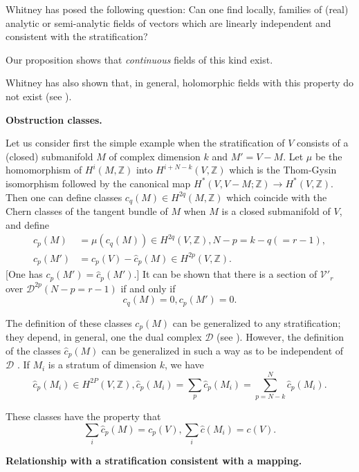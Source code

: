 Whitney has posed the following question: Can one find locally,
families of (real) analytic or semi-analytic fields of vectors which
are linearly independent and consistent with the stratification?

Our proposition shows that {\em continuous} fields of this kind exist.

Whitney has also shown that, in general, holomorphic fields with this
property do not exist (see \cite{key6}).

\medskip
{\large\bf Obstruction classes.}\pageoriginale
\smallskip

Let us consider first the simple example when the stratification of
$V$ consists of a (closed) submanifold $M$ of complex dimension $k$
and $M'=V-M$. Let $\mu$ be the homomorphism of $H^{i}(M,\mathbb{Z})$
into $H^{i+N-k}(V,\mathbb{Z})$ which is the Thom-Gysin isomorphism
followed by the canonical map $H^{*}(V,V-M;\mathbb{Z})\to
H^{*}(V,\mathbb{Z})$. Then one can define classes $c_{q}(M)\in
H^{2q}(M,\mathbb{Z})$ which coincide with the Chern classes of the
tangent bundle of $M$ when $M$ is a closed submanifold of $V$, and define
\begin{align*}
 \hat{c}_p(M)&=\mu(c_q(M)) \in H^{2q}(V,\mathbb{Z}),N-p=k-q(=r-1),\\
  \hat{c}_p(M')&=c_p(V)-\hat{c}_p(M)\in H^{2p}(V,\mathbb{Z}).
\end{align*}
[One has $c_{p}(M')=\hat{c}_{p}(M')$.] It can be shown that there is a
section of $\mathscr{V}'_{r}$ over $\mathscr{D}^{2p}(N-p=r-1)$ if and
only if
$$
c_q(M)=0,c_p(M')=0.
$$

The definition of these classes $c_{p}(M)$ can be generalized to any
stratification; they depend, in general, one the dual complex
$\mathscr{D}$ (see \cite{key5}). However, the definition of the
classes $\hat{c}_{p}(M)$ can be generalized in such a way as to be
independent of $\mathscr{D}$ \cite{key5}. If $M_{i}$ is a stratum of
dimension $k$, we have
 $$
 \hat{c}_p(M_i)\in
 H^{2P}(V,\mathbb{Z}),\hat{c}_p(M_i)=\sum_{p}\hat{c}_p(M_i)=\sum^{N}_{p=N-k}
 \hat{c}_p(M_i).  
 $$

 These classes have the property that  
 $$
\sum_{i}  \hat{c}_p(M) = c_p(V),  \sum_{i} \hat{c}(M_i)
= c(V).
$$\pageoriginale

\medskip
\noindent
{\large\bf Relationship with a stratification consistent with a
  mapping.}
\smallskip

